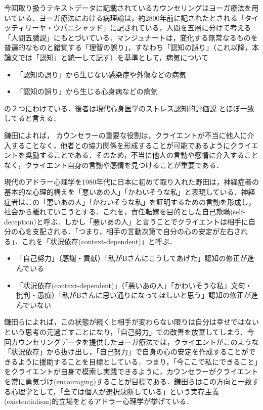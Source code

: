 \documentclass[shuuron]{kuee}
\begin{document}
今回取り扱うテキストデータに記載されているカウンセリングはヨーガ療法を用いている．ヨーガ療法における病理論は，約2800年前に記されたとされる「タイッティリーヤ・ウパニシャッド」に記されている，人間を五層に分けて考える「人間五臓説」にもとづいている\cite{kimura}．マンジュナート\cite{manjunath}は，変化する無常なるものを普遍的なものと錯覚する「理智の誤り」，すなわち「認知の誤り」（これ以降，本論文では「認知」と統一して記す）を基準として，病気について
\begin{itemize}
  \item 「認知の誤り」から生じない感染症や外傷などの病気
  \item 「認知の誤り」から生じる心身病などの病気
\end{itemize}
の２つにわけている．後者は現代心身医学のストレス認知的評価説%
\cite{Lazarus}とほぼ一致してると言える\cite{Darshana}．


鎌田\cite{kamata2002}によれば， カウンセラーの重要な役割は，クライエントが不当に他人に介入することなく，他者との協力関係を形成することが可能であるようにクライエントを奨励することである．そのため，不当に他人の言動や感情に介入することなく，クライエント自身の言動や感情を見つけることが重要である．

現代のアドラー心理学を1980年代に日本に初めて取り入れた野田\cite{zokad}は，神経症者の基本的な心理的構えを「悪いあの人」「かわいそうな私」と表現している．神経症者はこの「悪いあの人」「かわいそうな私」を証明するための言動を形成し，社会から離れていこうとする．これを，責任転嫁を目的とした自己欺瞞(self-deception)と呼ぶ\cite{Darshana}．しかし「悪いあの人」と言うことでクライエントは相手に自分の心を支配される．「つまり，相手の言動次第で自分の心の安定が左右される」．これを「状況依存(context-dependent)」と呼ぶ．
\begin{itemize}
  \item 「自己努力」（感謝・貢献）「私がBさんにこうしてあげた」認知の修正が進んでいる
  \item 「状況依存(context-dependent)」（「悪いあの人」「かわいそうな私」文句・批判・愚痴）「私がBさんに思い通りになってほしいと思う」認知の修正が進んでいない
\end{itemize}

鎌田ら\cite{Darshana}によれば，この状態が続くと相手が変わらない限りは自分は幸せではないという思考の元過ごすことになり，「自己努力」での改善を放棄してしまう．今回カウンセリングデータを提供したヨーガ療法では，クライエントがこのような「状況依存」から抜け出し，「自己努力」で自身の心の安定を作成することができるように援助することを目標としている．つまり，「今ここで私にできること」をクライエントが自身で模索し実践できるように，カウンセラーがクライエントを常に勇気づけ(encouraging)することが目標である．鎌田らはこの方向と一致する心理学として，「全ては個人が選択決断している」という実存主義(existentialism)的立場をとるアドラー心理学が挙げている．
\end{document}

